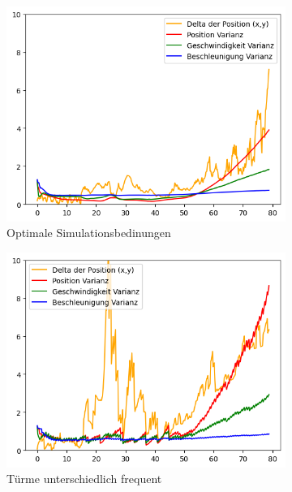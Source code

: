 \begin{figure}
    \begin{subfigure}{.333\textwidth}
        \centering
        \includegraphics[width=.9\linewidth]{Ergebnisse/plots_ungenauigkeiten/winkel/winkel_dyn_acc_basic.png}  
        \caption{Optimale Simulationsbedinungen}
    \end{subfigure}    
    \begin{subfigure}{.333\textwidth}
        \centering
        \includegraphics[width=.9\linewidth]{Ergebnisse/plots_ungenauigkeiten/winkel/winkel_dyn_acc_freq.png}  
        \caption{Türme unterschiedlich frequent}
    \end{subfigure}    
    \begin{subfigure}{.333\textwidth}
        \centering

\end{subfigure}
\end{figure}
